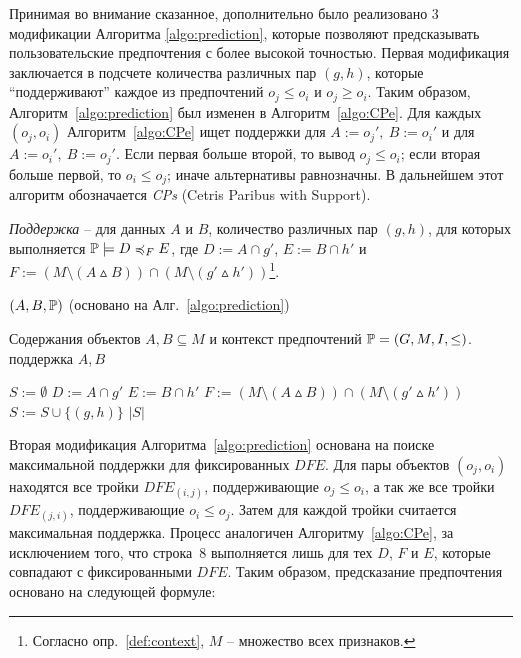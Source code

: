 	Принимая во внимание сказанное, дополнительно было реализовано 3 модификации Алгоритма \ref{algo:prediction}, которые позволяют предсказывать пользовательские предпочтения с более высокой точностью.
	Первая модификация заключается в подсчете количества различных пар $(g,h)$, которые ``поддерживают'' каждое из предпочтений $o_j \leq o_i$ и $o_j \geq o_i$. Таким образом, Алгоритм~\ref{algo:prediction} был изменен в Алгоритм~\ref{algo:CPe}. Для каждых $(o_j, o_i)$ Алгоритм~\ref{algo:CPe} ищет поддержки для $A:=o_j',\: B:=o_i'$ и для $A:=o_i',\: B:=o_j'$. Если первая больше второй, то вывод $o_j \leq o_i$; если вторая больше первой, то $o_i \leq o_j$; иначе альтернативы равнозначны. В дальнейшем этот алгоритм обозначается \emph{CPs} (Cetris Paribus with Support).
	
	\begin{definition}
		\emph{Поддержка} – для данных $A$ и $B$, количество различных пар $(g, h)$, для которых выполняется $\PP \models \DEF$, где $D := A \cap g'$, $E := B \cap h'$ и $F := (M \setminus (A \vartriangle B)) \cap (M \setminus (g' \vartriangle h'))$\footnote{Согласно опр.~\ref{def:context}, $M$ – множество всех признаков.}.
	\end{definition}
	
	\begin{algorithm}
		\caption{$(A, B, \mathbb{P})$ (основано на Алг.~\ref{algo:prediction})}
		\label{algo:CPe}
		\begin{algorithmic}[1]
			\REQUIRE Содержания объектов $A, B \subseteq M$ и контекст предпочтений $\mathbb{P} = (G, M, I, \leq)$.
			\ENSURE поддержка $A, B$
			\item[]
			\STATE $S := \emptyset$
			\STATE $D := A \cap g'$
			\STATE $E := B \cap h'$
			\STATE $F := (M \setminus (A \vartriangle B)) \cap (M \setminus (g' \vartriangle h'))$
			\IF{$\PP \models \DEF$}
			\STATE $S := S \cup \{(g, h)\}$
			\ENDIF
			\ENDFOR
			\ENDFOR
			\RETURN $|S|$
		\end{algorithmic}
	\end{algorithm}
	
	Вторая модификация Алгоритма~\ref{algo:prediction} основана на поиске максимальной поддержки для фиксированных $DFE$. Для пары объектов $(o_j, o_i)$ находятся все тройки $DFE_{(i,j)}$, поддерживающие $o_j \leq o_i$, а так же все тройки $DFE_{(j,i)}$, поддерживающие $o_i \leq o_j$. Затем для каждой тройки считается максимальная поддержка. Процесс аналогичен Алгоритму~\ref{algo:CPe}, за исключением того, что строка~8 выполняется лишь для тех $D$, $F$ и $E$, которые совпадают с фиксированными $DFE$. Таким образом, предсказание предпочтения основано на следующей формуле:
	
